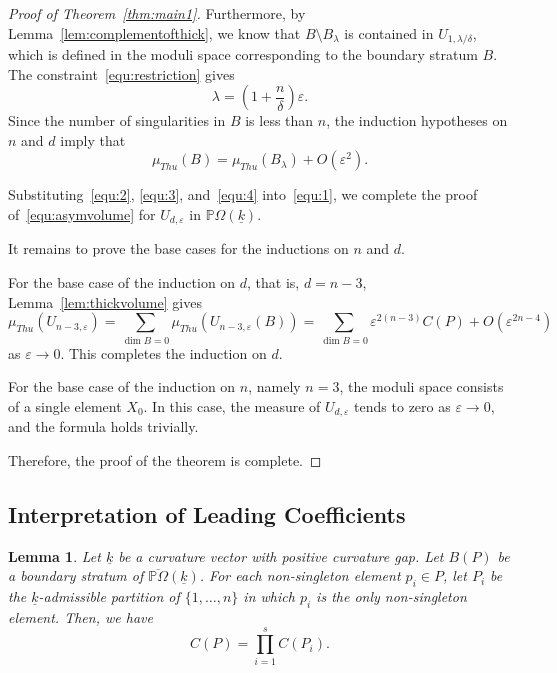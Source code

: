 \documentclass{compositio}
\numberwithin{equation}{section}
\numberwithin{figure}{section}
\theoremstyle{definition}
\theoremstyle{plain}
\newtheorem{lemma}[definition]{Lemma}
\begin{document}
{\begin{proof}[Proof of Theorem~\ref{thm:main1}]
    Furthermore, by Lemma~\ref{lem:complementofthick}, we know that $B\setminus B_\lambda$ is contained in $U_{1,\lambda/\delta}$, which is defined in the moduli space corresponding to the boundary stratum $B$. The constraint~\eqref{equ:restriction} gives
    $$
    \lambda = \left(1 + \frac{n}{\delta}\right)\varepsilon.
    $$
    Since the number of singularities in $B$ is less than $n$, the induction hypotheses on $n$ and $d$ imply that
    \begin{equation}\label{equ:4}
        \mu_{Thu}(B) = \mu_{Thu}(B_\lambda) + O(\varepsilon^2).
    \end{equation}

    Substituting~\eqref{equ:2}, \eqref{equ:3}, and~\eqref{equ:4} into~\eqref{equ:1}, we complete the proof of~\eqref{equ:asymvolume} for $U_{d,\varepsilon}$ in $\mathbb{P}\Omega(\underline{k})$.

    It remains to prove the base cases for the inductions on $n$ and $d$. 

    For the base case of the induction on $d$, that is, $d = n-3$, Lemma~\ref{lem:thickvolume} gives
    $$
    \mu_{Thu}(U_{n-3,\varepsilon}) =\sum\limits_{\dim B= 0}\mu_{Thu}(U_{n-3,\varepsilon}(B)) = \sum\limits_{\dim B= 0} \varepsilon^{2(n-3)}C(P) + O(\varepsilon^{2n-4})
    $$
    as $\varepsilon \to 0$. This completes the induction on $d$.   
    
    For the base case of the induction on $n$, namely $n = 3$, the moduli space consists of a single element $X_0$. In this case, the measure of $U_{d,\varepsilon}$ tends to zero as $\varepsilon \to 0$, and the formula holds trivially.

    Therefore, the proof of the theorem is complete.
\end{proof}


\subsection{Interpretation of Leading Coefficients}\label{sec:computationconstant}

\begin{lemma}\label{lem:nonsingletonproduct}
Let $\underline{k}$ be a curvature vector with positive curvature gap. Let $B(P)$ be a boundary stratum of $\overline{\mathbb{P}\Omega}(\underline{k})$. For each non-singleton element $p_i\in P$, let $P_i$ be the $\underline{k}$-admissible partition of $\{1,\ldots,n\}$ in which $p_i$ is the only non-singleton element. Then, we have
$$
C(P) = \prod_{i=1}^{s} C(P_i).
$$
\end{lemma}

}
\end{document}
